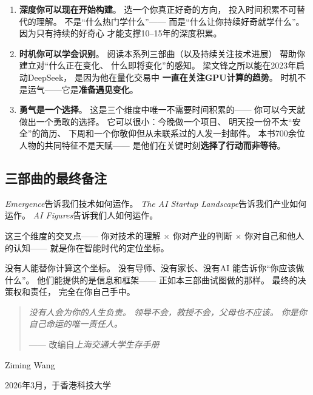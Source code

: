 \begin{keybox}[三个可以行动的维度]
\begin{enumerate}
  \item \textbf{深度你可以现在开始构建}。
    选一个你真正好奇的方向，
    投入时间积累不可替代的理解。
    不是``什么热门学什么''——
    而是``什么让你持续好奇就学什么''。
    因为只有持续的好奇心
    才能支撑10--15年的深度积累。

  \item \textbf{时机你可以学会识别}。
    阅读本系列三部曲（以及持续关注技术进展）
    帮助你建立对``什么正在变化、
    什么即将变化''的感知。
    梁文锋之所以能在2023年启动DeepSeek，
    是因为他在量化交易中
    \textbf{一直在关注GPU计算的趋势}。
    时机不是运气——它是\textbf{准备遇见变化}。

  \item \textbf{勇气是一个选择}。
    这是三个维度中唯一不需要时间积累的——
    你可以今天就做出一个勇敢的选择。
    它可以很小：今晚做一个项目、
    明天投一份不太``安全''的简历、
    下周和一个你敬仰但从未联系过的人发一封邮件。
    本书700余位人物的共同特征不是天赋——
    是他们在关键时刻\textbf{选择了行动而非等待}。
\end{enumerate}
\end{keybox}

\subsection{三部曲的最终备注}

\textit{Emergence}告诉我们技术如何运作。
\textit{The AI Startup Landscape}告诉我们产业如何运作。
\textit{AI Figures}告诉我们人如何运作。

这三个维度的交叉点——
你对技术的理解 $\times$ 你对产业的判断 $\times$
你对自己和他人的认知——
就是你在智能时代的定位坐标。

没有人能替你计算这个坐标。
没有导师、没有家长、没有AI
能告诉你``你应该做什么''。
他们能提供的是信息和框架——
正如本三部曲试图做的那样。
最终的决策权和责任，
完全在你自己手中。

\begin{quote}
\itshape
没有人会为你的人生负责。
领导不会，教授不会，父母也不应该。
你是你自己命运的唯一责任人。

\upshape\footnotesize
—— 改编自\textit{上海交通大学生存手册}
\end{quote}

\bigskip
\hfill Ziming Wang

\hfill 2026年3月，于香港科技大学
